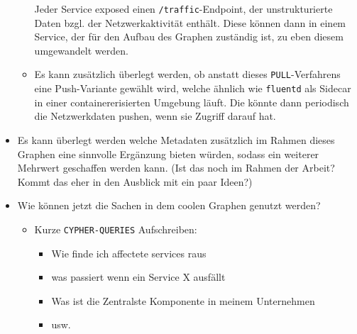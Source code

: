 \begin{itemize}
\begin{itemize}
		Jeder Service exposed einen \texttt{/traffic}-Endpoint, der unstrukturierte Daten bzgl. der Netzwerkaktivität enthält. Diese können dann in einem Service, der für den Aufbau des Graphen zuständig ist, zu eben diesem umgewandelt werden.
		\item Es kann zusätzlich überlegt werden, ob anstatt dieses \texttt{PULL}-Verfahrens eine Push-Variante gewählt wird, welche ähnlich wie \texttt{fluentd} als Sidecar in einer containererisierten Umgebung läuft. Die könnte dann periodisch die Netzwerkdaten pushen, wenn sie Zugriff darauf hat.
	\end{itemize}
	\item Es kann überlegt werden welche Metadaten zusätzlich im Rahmen dieses Graphen eine sinnvolle Ergänzung bieten würden, sodass ein weiterer Mehrwert geschaffen werden kann. (Ist das noch im Rahmen der Arbeit? Kommt das eher in den Ausblick mit ein paar Ideen?)
	\item Wie können jetzt die Sachen in dem coolen Graphen genutzt werden?
	\begin{itemize}
		\item Kurze \texttt{CYPHER-QUERIES} Aufschreiben:
		\begin{itemize}
			\item Wie finde ich affectete services raus
			\item was passiert wenn ein Service X ausfällt
			\item Was ist die Zentralste Komponente in meinem Unternehmen
			\item usw.
		\end{itemize}
	\end{itemize}
\end{itemize}
